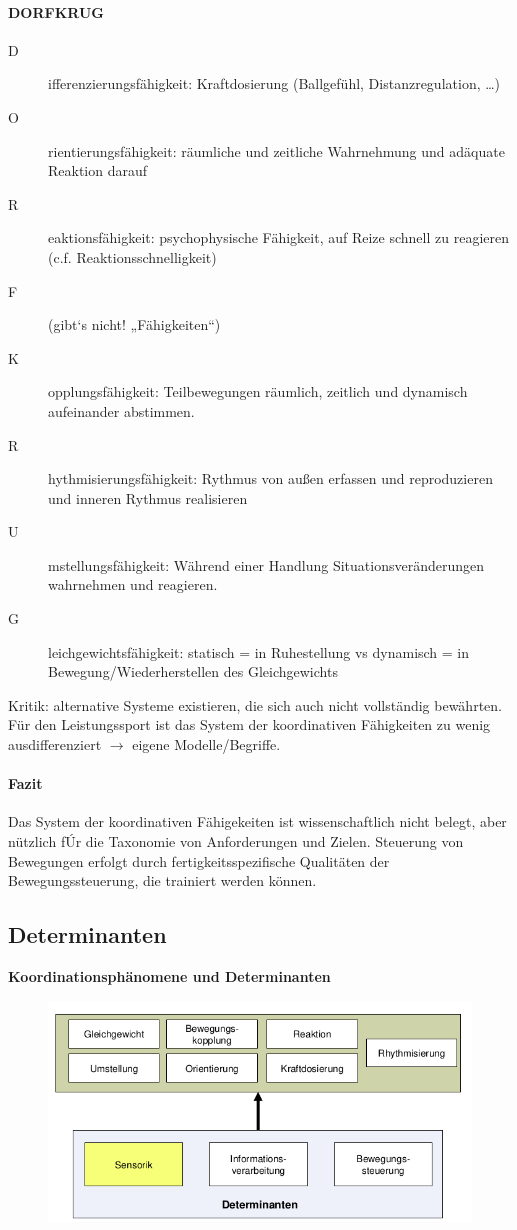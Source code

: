 \paragraph{DORFKRUG}
\begin{description}
  \item[D]ifferenzierungsfähigkeit: Kraftdosierung (Ballgefühl, Distanzregulation, \ldots)
  \item[O]rientierungsfähigkeit: räumliche und zeitliche Wahrnehmung und adäquate Reaktion darauf
  \item[R]eaktionsfähigkeit: psychophysische Fähigkeit, auf Reize schnell zu reagieren (c.f. Reaktionsschnelligkeit)
  \item[F] (gibt‘s nicht! „Fähigkeiten“)
  \item[K]opplungsfähigkeit: Teilbewegungen räumlich, zeitlich und dynamisch aufeinander abstimmen.
  \item[R]hythmisierungsfähigkeit: Rythmus von außen erfassen und reproduzieren und inneren Rythmus realisieren
  \item[U]mstellungsfähigkeit: Während einer Handlung Situationsveränderungen wahrnehmen und reagieren.
  \item[G]leichgewichtsfähigkeit: statisch = in Ruhestellung vs dynamisch = in Bewegung/Wiederherstellen des Gleichgewichts
\end{description}
Kritik: alternative Systeme existieren, die sich auch nicht vollständig bewährten.
Für den Leistungssport ist das System der koordinativen Fähigkeiten zu wenig ausdifferenziert $\rightarrow$ eigene Modelle/Begriffe.
\paragraph{Fazit} Das System der koordinativen Fähigekeiten ist wissenschaftlich nicht belegt, aber nützlich fÚr die Taxonomie von Anforderungen und Zielen. 
Steuerung von Bewegungen erfolgt durch fertigkeitsspezifische Qualitäten der Bewegungssteuerung, die trainiert werden können.

\subsection{Determinanten}
\textbf{Koordinationsphänomene und Determinanten}\\
\begin{figure}[H]
  \includegraphics[width=.7\textwidth]{pictures/koordinationsphaenomene_und_determinanten.png}
  \centering
\end{figure}
